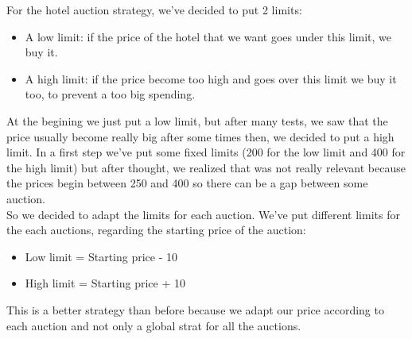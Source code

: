 For the hotel auction strategy, we've decided to put 2 limits:\\
\begin{itemize}
\item A low limit: if the price of the hotel that we want goes under this limit, we buy it.
\item A high limit: if the price become too high and goes over this limit we buy it too, to prevent a too big spending.
\end{itemize}
At the begining we just put a low limit, but after many tests, we saw that the price usually become really big after some times then, we decided to put a high limit.
In a first step we've put some fixed limits (200 for the low limit and 400 for the high limit) but after thought, we realized that was not really relevant because the prices begin between 250 and 400 so there can be a gap between some auction.\\
So we decided to adapt the limits for each auction. We've put different limits for the each auctions, regarding the starting price of the auction:\\
\begin{itemize}
\item Low limit = Starting price - 10%
\item High limit = Starting price + 10%
\end{itemize}
This is a better strategy than before because we adapt our price according to each auction and not only a global strat for all the auctions.